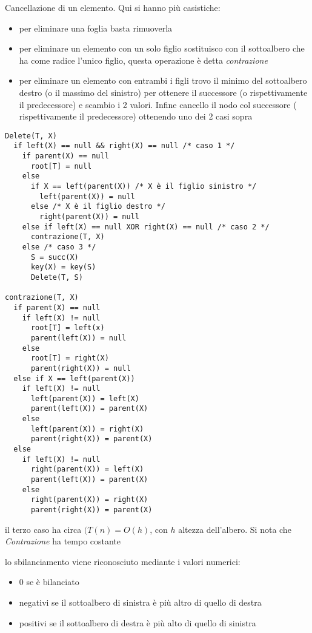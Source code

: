 \documentclass[a4paper,12pt,oneside,tikz]{book}
\begin{document}
\begin{esempio}
Cancellazione di un elemento. Qui si hanno più casistiche:
\begin{itemize}
\item per eliminare una foglia basta rimuoverla
\item per eliminare un elemento con un solo figlio sostituisco con il sottoalbero che ha come radice l'unico figlio, questa operazione è detta \textit{contrazione}
\item per eliminare un elemento con entrambi i figli trovo il minimo del sottoalbero destro (o il massimo del sinistro) per ottenere il successore (o rispettivamente il predecessore) e scambio i 2 valori. Infine cancello il nodo col successore ( rispettivamente il predecessore) ottenendo uno dei 2 casi sopra
\end{itemize}
\begin{verbatim}
Delete(T, X)
  if left(X) == null && right(X) == null /* caso 1 */
    if parent(X) == null 
      root[T] = null
    else
      if X == left(parent(X)) /* X è il figlio sinistro */
        left(parent(X)) = null
      else /* X è il figlio destro */
        right(parent(X)) = null
    else if left(X) == null XOR right(X) == null /* caso 2 */
      contrazione(T, X)
    else /* caso 3 */
      S = succ(X)
      key(X) = key(S)
      Delete(T, S)
  
contrazione(T, X)
  if parent(X) == null
    if left(X) != null
      root[T] = left(x)
      parent(left(X)) = null
    else
      root[T] = right(X)
      parent(right(X)) = null
  else if X == left(parent(X))
    if left(X) != null
      left(parent(X)) = left(X)
      parent(left(X)) = parent(X)
    else
      left(parent(X)) = right(X)
      parent(right(X)) = parent(X)
  else
    if left(X) != null
      right(parent(X)) = left(X)
      parent(left(X)) = parent(X)
    else
      right(parent(X)) = right(X)
      parent(right(X)) = parent(X)
\end{verbatim}
il terzo caso ha circa $(T(n)=O(h)$, con $h$ altezza dell'albero. Si nota che \textit{Contrazione} ha tempo costante 
\end{esempio}
lo sbilanciamento viene riconosciuto mediante i valori numerici:
\begin{itemize}
\item 0 se è bilanciato
\item negativi se il sottoalbero di sinistra è più altro di quello di destra
\item positivi se il sottoalbero di destra è più alto di quello di sinistra
\end{itemize}
\end{document}
